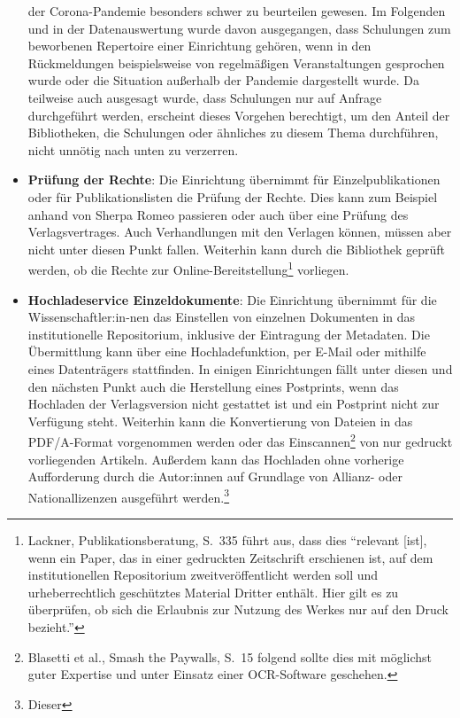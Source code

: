 \documentclass[a4paper,
fontsize=11pt,
oneside,
numbers=noperiodatend,
parskip=half-,
bibliography=totoc,
final
]{scrartcl}
\begin{document}
\begin{itemize}
{    der Corona-Pandemie besonders schwer zu beurteilen gewesen. Im
    Folgenden und in der Datenauswertung wurde davon ausgegangen, dass
    Schulungen zum beworbenen Repertoire einer Einrichtung gehören, wenn
    in den Rückmeldungen beispielsweise von regelmäßigen Veranstaltungen
    gesprochen wurde oder die Situation außerhalb der Pandemie
    dargestellt wurde. Da teilweise auch ausgesagt wurde, dass
    Schulungen nur auf Anfrage durchgeführt werden, erscheint dieses
    Vorgehen berechtigt, um den Anteil der Bibliotheken, die Schulungen
    oder ähnliches zu diesem Thema durchführen, nicht unnötig nach unten
    zu verzerren.}
\item
  \textbf{Prüfung der Rechte}: Die Einrichtung übernimmt für
  Einzelpublikationen oder für Publikationslisten die Prüfung der
  Rechte. Dies kann zum Beispiel anhand von Sherpa Romeo passieren oder
  auch über eine Prüfung des Verlagsvertrages. Auch Verhandlungen mit
  den Verlagen können, müssen aber nicht unter diesen Punkt fallen.
  Weiterhin kann durch die Bibliothek geprüft werden, ob die Rechte zur
  Online-Bereitstellung\footnote{Lackner, Publikationsberatung, S.~335
    führt aus, dass dies \enquote{relevant {[}ist{]}, wenn ein Paper,
    das in einer gedruckten Zeitschrift erschienen ist, auf dem
    institutionellen Repositorium zweitveröffentlicht werden soll und
    urheberrechtlich geschütztes Material Dritter enthält. Hier gilt es
    zu überprüfen, ob sich die Erlaubnis zur Nutzung des Werkes nur auf
    den Druck bezieht.}} vorliegen.
\item
  \textbf{Hochladeservice Einzeldokumente}: Die Einrichtung übernimmt
  für die Wissenschaftler:in-nen das Einstellen von einzelnen Dokumenten
  in das institutionelle Repositorium, inklusive der Eintragung der
  Metadaten. Die Übermittlung kann über eine Hochladefunktion, per
  E-Mail oder mithilfe eines Datenträgers stattfinden. In einigen
  Einrichtungen fällt unter diesen und den nächsten Punkt auch die
  Herstellung eines Postprints, wenn das Hochladen der Verlagsversion
  nicht gestattet ist und ein Postprint nicht zur Verfügung steht.
  Weiterhin kann die Konvertierung von Dateien in das PDF/A-Format
  vorgenommen werden oder das Einscannen\footnote{Blasetti et al., Smash
    the Paywalls, S.~15 folgend sollte dies mit möglichst guter
    Expertise und unter Einsatz einer OCR-Software geschehen.} von nur
  gedruckt vorliegenden Artikeln. Außerdem kann das Hochladen ohne
  vorherige Aufforderung durch die Autor:innen auf Grundlage von
  Allianz- oder Nationallizenzen ausgeführt werden.\footnote{Dieser
}
\end{itemize}
\end{document}
